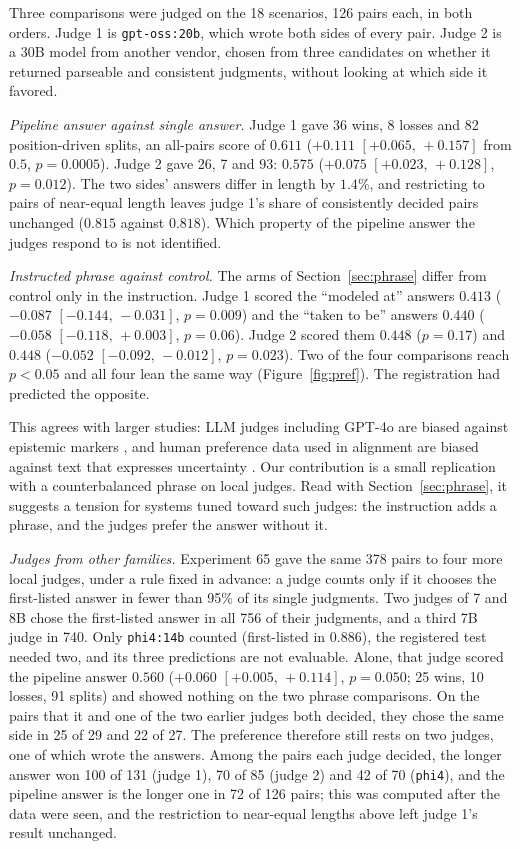 \documentclass[10pt,twocolumn]{article}
\newcommand{\ci}[2]{\ensuremath{[#1,\,#2]}}
\begin{document}
Three comparisons were judged on the 18 scenarios, 126 pairs each, in
both orders. Judge 1 is \texttt{gpt-oss:20b}, which wrote both sides of
every pair. Judge 2 is a 30B model from another vendor, chosen from
three candidates on whether it returned parseable and consistent
judgments, without looking at which side it favored.

\emph{Pipeline answer against single answer.} Judge 1 gave 36 wins, 8
losses and 82 position-driven splits, an all-pairs score of $0.611$
($+0.111$ \ci{+0.065}{+0.157} from $0.5$, $p=0.0005$). Judge 2 gave
26, 7 and 93: $0.575$ ($+0.075$ \ci{+0.023}{+0.128}, $p=0.012$). The
two sides' answers differ in length by $1.4\%$, and restricting to
pairs of near-equal length leaves judge 1's share of consistently
decided pairs unchanged ($0.815$ against $0.818$). Which property of the
pipeline answer the judges respond to is not identified.

\emph{Instructed phrase against control.} The arms of
Section~\ref{sec:phrase} differ from control only in the instruction.
Judge 1 scored the ``modeled at'' answers $0.413$ ($-0.087$
\ci{-0.144}{-0.031}, $p=0.009$) and the ``taken to be'' answers $0.440$
($-0.058$ \ci{-0.118}{+0.003}, $p=0.06$). Judge 2 scored them $0.448$
($p=0.17$) and $0.448$ ($-0.052$ \ci{-0.092}{-0.012}, $p=0.023$). Two
of the four comparisons reach $p<0.05$ and all four lean the same way
(Figure~\ref{fig:pref}). The registration had predicted the opposite.

This agrees with larger studies: LLM judges including GPT-4o are biased
against epistemic markers \cite{lee2025judges}, and human preference
data used in alignment are biased against text that expresses
uncertainty \cite{zhou2024relying}. Our contribution is a small
replication with a counterbalanced phrase on local judges. Read with
Section~\ref{sec:phrase}, it suggests a tension for systems tuned
toward such judges: the instruction adds a phrase, and the judges
prefer the answer without it.

\emph{Judges from other families.} Experiment 65 gave the same 378
pairs to four more local judges, under a rule fixed in advance: a judge
counts only if it chooses the first-listed answer in fewer than 95\% of
its single judgments. Two judges of 7 and 8B chose the first-listed
answer in all 756 of their judgments, and a third 7B judge in 740. Only
\texttt{phi4:14b} counted (first-listed in $0.886$), the registered
test needed two, and its three predictions are not evaluable. Alone,
that judge scored the pipeline answer $0.560$ ($+0.060$
\ci{+0.005}{+0.114}, $p=0.050$; 25 wins, 10 losses, 91 splits) and
showed nothing on the two phrase comparisons. On the pairs that it and
one of the two earlier judges both decided, they chose the same side in
25 of 29 and 22 of 27. The preference therefore still rests on two
judges, one of which wrote the answers. Among the pairs each judge
decided, the longer answer won 100 of 131 (judge 1), 70 of 85 (judge 2)
and 42 of 70 (\texttt{phi4}), and the pipeline answer is the longer one
in 72 of 126 pairs; this was computed after the data were seen, and the
restriction to near-equal lengths above left judge 1's result
unchanged.
\end{document}
